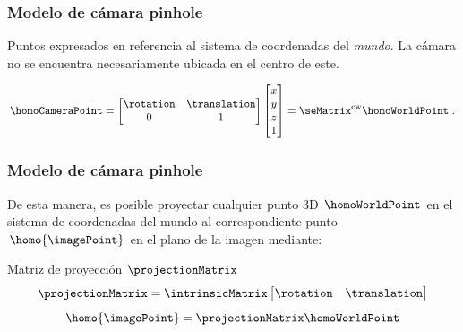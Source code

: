 \begin{frame}
\frametitle{Modelo de cámara pinhole}



Puntos expresados en referencia al sistema de coordenadas del \textit{mundo}. La cámara no se encuentra necesariamente ubicada en el centro de este.

\begin{figure}[!htb]
	\centering
	\hfill
\end{figure}

\begin{block}{}
\begin{equation}
\homoCameraPoint=\begin{bmatrix}\rotation & \translation\\
0 & 1
\end{bmatrix}\begin{bmatrix}x\\
y\\
z\\
1
\end{bmatrix}=\seMatrix^{\mathrm{c}\mathrm{w}}\homoWorldPoint\;.
\end{equation}
\end{block}

\end{frame}


\begin{frame}
\frametitle{Modelo de cámara pinhole}

De esta manera, es posible proyectar cualquier punto 3D
$\homoWorldPoint$ en el sistema de coordenadas del mundo al correspondiente
punto $\homo{\imagePoint}$ en el plano de la imagen mediante:

\begin{block}{Matriz de proyección \textmd{$\projectionMatrix$}}
\begin{equation}
\projectionMatrix=\intrinsicMatrix\begin{bmatrix}\rotation & \translation\end{bmatrix}
\end{equation}
\begin{equation}
\homo{\imagePoint}=\projectionMatrix\homoWorldPoint
\end{equation}
\end{block}

\end{frame}


